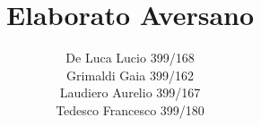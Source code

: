 \title{Elaborato Aversano}
\author{De Luca Lucio 399/168\\Grimaldi Gaia 399/162\\Laudiero Aurelio  399/167\\Tedesco Francesco 399/180}
